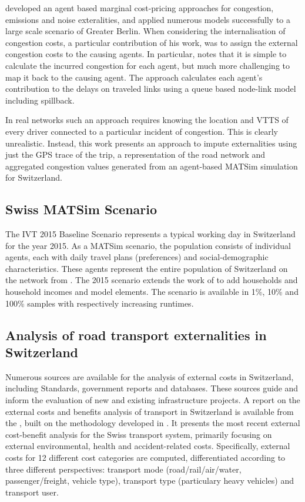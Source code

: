\citet{kaddoura2015marginal} developed an agent based marginal cost-pricing approaches for congestion, emissions and noise exteralities, and applied numerous models successfully to a large scale scenario of Greater Berlin.
When considering the internalisation of congestion costs, a particular contribution of his work, was to assign the external congestion costs to the causing agents.
In particular, \citet{kaddoura2015marginal} notes that it is simple to calculate the incurred congestion for each agent, but much more challenging to map it back to the causing agent.
The approach calculates each agent's contribution to the delays on traveled links using a queue based node-link model including spillback.

In real networks such an approach requires knowing the location and VTTS of every driver connected to a particular incident of congestion.
This is clearly unrealistic. Instead, this work presents an approach to impute externalities using just the GPS trace of the trip, a representation of the road network and aggregated congestion values generated from an agent-based MATSim simulation for Switzerland.

\subsection{Swiss MATSim Scenario}
The IVT 2015 Baseline Scenario \cite{boesch2015ivt} represents a typical working day in Switzerland for the year 2015.
As a MATSim scenario, the population consists of individual agents, each with daily travel plans (preferences) and social-demographic characteristics.
These agents represent the entire population of Switzerland on the network from \cite{boesch2015network}.
The 2015 scenario extends the work of \cite{Balmer2007switzerland} to add households and household incomes and model elements. The scenario is available in 1\%, 10\% and 100\% samples with respectively increasing runtimes. 

\subsection{Analysis of road transport externalities in Switzerland}  %

Numerous sources are available for the analysis of external costs in Switzerland, including Standards, government reports and databases. These sources guide and inform the evaluation of new and existing infrastructure projects. A report on the external costs and benefits analysis of transport in Switzerland is available from the \citet{are2016externalcosts}, built on the methodology developed in \cite{ecoplaninfras2014externeeffekte}.
It presents the most recent external cost-benefit analysis for the Swiss transport system, primarily focusing on external environmental, health and accident-related costs.
Specifically, external costs for 12 different cost categories are computed, differentiated according to three different perspectives: transport mode (road/rail/air/water, passenger/freight, vehicle type), transport type (particulary heavy vehicles) and transport user. 

